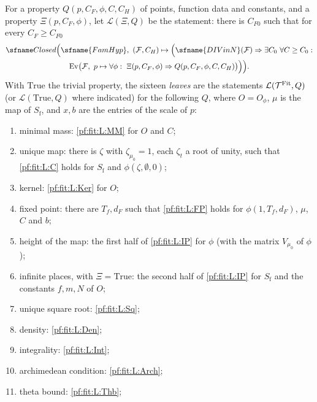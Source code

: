 \begin{definition}\label{pf:fit:leafst}
For a property $Q(p,C_F,\phi,C,C_H)$ of points, function data and constants, and a property $\Xi(p,C_F,\phi)$, let
$\mathcal L(\Xi,Q)$ be the statement: there is $C_{F0}$ such that for every $C_F\ge C_{F0}$
\begin{multline*}
\fitClosed\Bigl(\sfname{FamHyp},\ (\mathcal F,C_H)\mapsto\Bigl(\sfname{DIVinN}(\mathcal F)\Rightarrow\exists C_0\
\forall C\ge C_0:\\ \fitEv\bigl(\mathcal F,\ p\mapsto\forall\phi:\ \Xi(p,C_F,\phi)\Rightarrow Q(p,C_F,\phi,C,C_H)\bigr)\Bigr)\Bigr).
\end{multline*}
With $\mathrm{True}$ the trivial property, the sixteen \emph{leaves} are the statements $\mathcal L(\mathcal T^{\mathrm{Fit}},Q)$ (or
$\mathcal L(\mathrm{True},Q)$ where indicated) for the following $Q$, where $O=O_\phi$, $\mu$ is the map of $S_{\mathrm f}$,
and $x,b$ are the entries of the scale of $p$:
\begin{enumerate}[label=(F\arabic*),leftmargin=*]
\item\label{pf:fit:F:MM} minimal mass: \ref{pf:fit:L:MM} for $O$ and $C$;
\item\label{pf:fit:F:C} unique map: there is $\zeta$ with $\zeta_{\mu_0}=1$, each $\zeta_t$ a root of unity, such that
\ref{pf:fit:L:C} holds for $S_{\mathrm f}$ and $\phi(\zeta,\emptyset,0)$;
\item\label{pf:fit:F:Ker} kernel: \ref{pf:fit:L:Ker} for $O$;
\item\label{pf:fit:F:FP} fixed point: there are $T_f,d_F$ such that \ref{pf:fit:L:FP} holds for $\phi(1,T_f,d_F)$, $\mu$, $C$ and
$b$;
\item\label{pf:fit:F:IPa} height of the map: the first half of \ref{pf:fit:L:IP} for $\phi$ (with the matrix $V_{\mu_0}$ of
$\phi$);
\item\label{pf:fit:F:IPb} infinite places, with $\Xi=\mathrm{True}$: the second half of \ref{pf:fit:L:IP} for $S_{\mathrm f}$
and the constants $f,m,N$ of $O$;
\item\label{pf:fit:F:Sq} unique square root: \ref{pf:fit:L:Sq};
\item\label{pf:fit:F:Den} density: \ref{pf:fit:L:Den};
\item\label{pf:fit:F:Int} integrality: \ref{pf:fit:L:Int};
\item\label{pf:fit:F:Arch} archimedean condition: \ref{pf:fit:L:Arch};
\item\label{pf:fit:F:Thb} theta bound: \ref{pf:fit:L:Thb};

\end{enumerate}
\end{definition}
